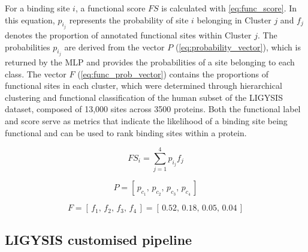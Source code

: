 For a binding site $i$, a functional score $FS$ is calculated with \autoref{eq:func_score}. In this equation, $p_{i_{j}}$ represents the probability of site $i$ belonging in Cluster $j$ and $f_j$ denotes the proportion of annotated functional sites within Cluster $j$. The probabilities $p_{i_{j}}$ are derived from the vector $P$ (\autoref{eq:probability_vector}), which is returned by the MLP and provides the probabilities of a site belonging to each class. The vector $F$ (\autoref{eq:func_prob_vector}) contains the proportions of functional sites in each cluster, which were determined through hierarchical clustering and functional classification of the human subset of the LIGYSIS dataset, composed of 13,000 sites across 3500 proteins. Both the functional label and score serve as metrics that indicate the likelihood of a binding site being functional and can be used to rank binding sites within a protein.

\begin{equation}
FS_i = \sum_{j=1}^{4} p_{i_{j}} f_j
\label{eq:func_score}
\end{equation}

\vspace{-12pt} %
\vspace{-12pt} %

\begin{equation}
P = [\,p_{c_1},\,p_{c_2},\,p_{c_3},\,p_{c_4}\,]
\label{eq:probability_vector}
\end{equation}

\vspace{-12pt} %
\vspace{-12pt} %

\begin{equation}
F = [\,f_{1},\,f_{2},\,f_{3},\,f_{4}\,] 
    = [\,0.52,\,0.18,\,0.05,\,0.04\,]
\label{eq:func_prob_vector}
\end{equation}

\vspace{-12pt} %
\vspace{-12pt} %

\subsection{LIGYSIS customised pipeline}

